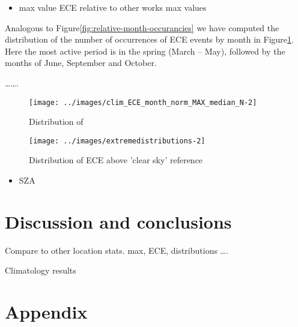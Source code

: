 \documentclass[
  preprint, 3p, authoryear]{article}
\providecommand{\tightlist}{%
  \setlength{\itemsep}{0pt}\setlength{\parskip}{0pt}}
\begin{document}
\begin{itemize}
\tightlist
\item
  max value ECE
  relative to other works max values
\end{itemize}

Analogous to Figure\nobreakspace{}\ref{fig:relative-month-occurancies} we have
computed the distribution of the number of occurrences of ECE events by month in
Figure\nobreakspace{}\ref{fig:relative-month-occurancies-ECE}. Here the most active
period is in the spring (March -- May), followed by the months of June, September and
October.

\ldots\ldots.

\begin{figure}

{\centering \texttt{[image: ../images/clim\_ECE\_month\_norm\_MAX\_median\_N-2]} 

}

\caption{Distribution of }\label{fig:relative-month-occurancies-ECE}
\end{figure}

\begin{figure}

{\centering \texttt{[image: ../images/extremedistributions-2]} 

}

\caption{Distribution of ECE above 'clear sky' reference}\label{fig:unnamed-chunk-4}
\end{figure}

\begin{itemize}
\tightlist
\item
  SZA
\end{itemize}

\hypertarget{discussion-and-conclusions}{%
\section{Discussion and conclusions}\label{discussion-and-conclusions}}

Compare to other location stats.
max, ECE, distributions \ldots.

Climatology results

\hypertarget{appendix}{%
\section*{Appendix}\label{appendix}}
\end{document}

